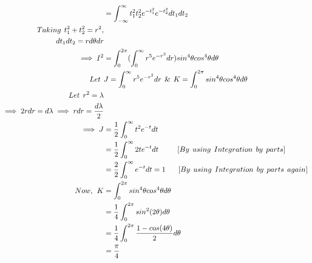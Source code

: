\documentclass[a4paper,fleqn,11pt]{article}
\theoremstyle{mytheor}
\begin{document}
\begin{align*}
& = \int_{-\infty}^{\infty} t_{1}^2 t_{2}^2 e^{-t_{1}^2} e^{-t_{2}^2} dt_{1} dt_{2} \\
Taking \hspace{1ex} t_{1}^2 + t_{2}^2 = r^2, \\
dt_{1}dt_{2} = rd \theta dr \\
\implies I^2 & = \int_{0}^{2\pi} (\int_{0}^{\infty} r^5 e^{-r^2} dr) sin^4 \theta cos^4 \theta d\theta \\
Let \hspace{1ex} & J = \int_{0}^{\infty} r^5 e^{-r^2} dr \hspace{1ex} \& \hspace{1ex} K = \int_{0}^{2\pi} sin^4 \theta cos^4 \theta d\theta \\
Let \hspace{1ex} r^2 = \lambda \\
\implies 2r dr = d\lambda \implies r dr = \frac{d\lambda}{2} \\
\implies J & = \frac{1}{2} \int_{0}^{\infty} t^2 e^{-t} dt \\
& = \frac{1}{2} \int_{0}^{\infty} 2t e^{-t} dt \hspace{6ex} [By \hspace{1ex} using \hspace{1ex} Integration \hspace{1ex} by \hspace{1ex} parts] \\
& = \frac{2}{2} \int_{0}^{\infty} e^{-t} dt = 1 \hspace{4ex} [By \hspace{1ex} using \hspace{1ex} Integration \hspace{1ex} by \hspace{1ex} parts \hspace{1ex}
 again] \\ 
Now, \hspace{1ex} K & = \int_{0}^{2\pi} sin^4 \theta cos^4 \theta d\theta \\
& = \frac{1}{4} \int_{0}^{2\pi} sin^2 (2\theta) d\theta \\
& = \frac{1}{4} \int_{0}^{2\pi} \frac{1 - cos (4\theta)}{2} d\theta \\
& = \frac{\pi}{4} \\
\end{align*}
\end{document}
